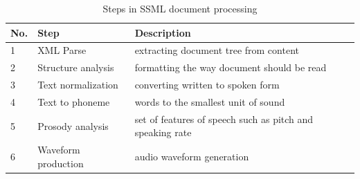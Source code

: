 \documentclass[11pt,a4paper,oneside,article]{memoir}
\begin{document}
\begin{table}[h]

 \caption{Steps in SSML document processing}
    \begin{tabular}{ | l | l | l | }
    \hline
    No. &Step &Description \\ \hline
    1 & XML Parse & extracting document tree from content \\ \hline
    2 & Structure analysis  & formatting the way document should be read  \\ \hline
    3 & Text normalization  & converting written to spoken form\\ \hline
    4 & Text to phoneme  &  words to the smallest unit of sound  \\ \hline
    5 & Prosody analysis  &   set of features of speech such as pitch and speaking rate\\ \hline
    6 & Waveform production  & audio waveform generation  \\ \hline
  
    \end{tabular}

\end{table}



\end{document}
